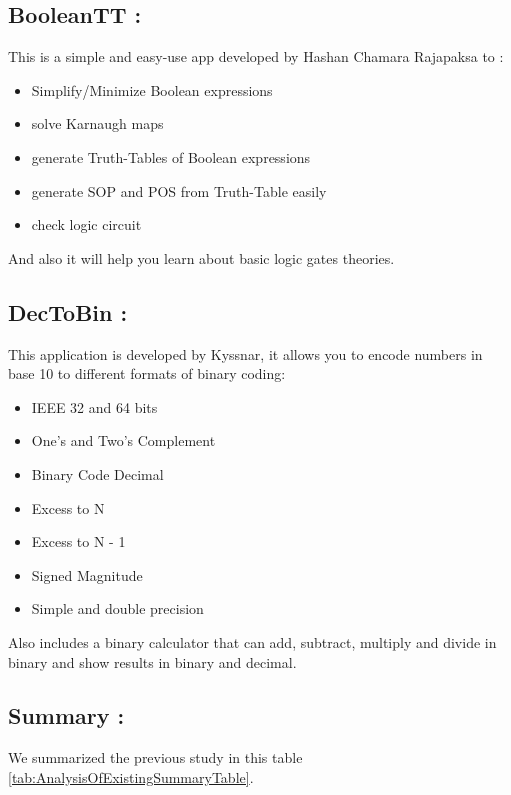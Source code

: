  
 
 \subsection{BooleanTT :}
 This is a simple and easy-use app developed by Hashan Chamara Rajapaksa to :
 \begin{itemize}
	 \item Simplify/Minimize Boolean expressions
	 \item solve Karnaugh maps
	 \item generate Truth-Tables of Boolean expressions
	 \item generate SOP and POS from Truth-Table easily
	 \item check logic circuit
 \end{itemize}
 And also it will help you learn about basic logic gates theories.\cite{BooleanTT}
 
 \subsection{DecToBin :}
 This application is developed by Kyssnar, it allows you to encode numbers in base 10 to different formats of binary coding:
 \begin{itemize}
	\item IEEE 32 and 64 bits
	\item One's and Two's Complement
	\item Binary Code Decimal
	\item Excess to N
	\item Excess to N - 1
	\item Signed Magnitude
	\item Simple and double precision
\end{itemize}
 Also includes a binary calculator that can add, subtract, multiply and divide in binary and show results in binary and decimal.\cite{dectobin}
 
 \subsection{Summary :}
We summarized the previous study in this table \ref{tab:AnalysisOfExistingSummaryTable}.

